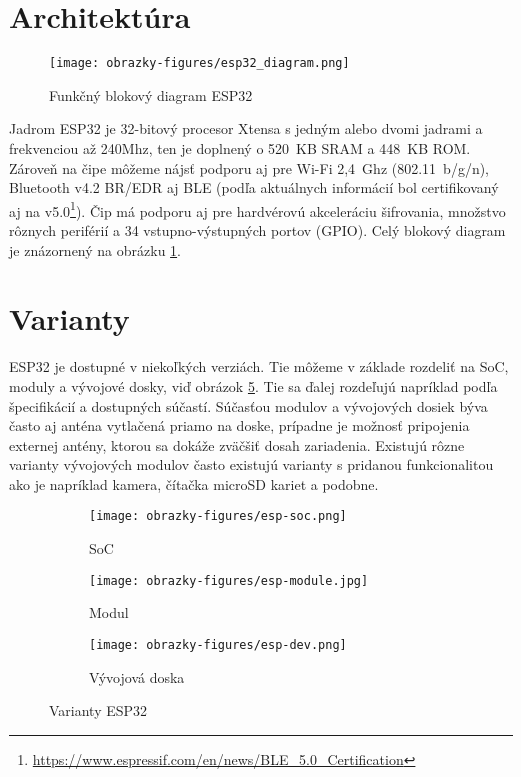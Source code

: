 \section{Architektúra}

\begin{figure}[ht]
    \centering
    \texttt{[image: obrazky-figures/esp32\_diagram.png]}
    \caption{Funkčný blokový diagram ESP32\cite{esp-datasheet}}
    \label{fig:esp_diagram}
\end{figure}

Jadrom ESP32 je 32-bitový procesor Xtensa s jedným alebo dvomi jadrami a frekvenciou až 240Mhz, ten je doplnený o 520~KB SRAM a 448~KB ROM. Zároveň na čipe môžeme nájsť podporu aj pre Wi-Fi 2,4~Ghz (802.11~b/g/n), Bluetooth v4.2 BR/EDR aj BLE (podľa aktuálnych informácií bol certifikovaný aj na v5.0\footnote{\url{https://www.espressif.com/en/news/BLE_5.0_Certification}}).
Čip má podporu aj pre hardvérovú akceleráciu šifrovania, množstvo rôznych periférií a 34 vstupno-výstupných portov (GPIO). Celý blokový diagram je znázornený na obrázku \ref{fig:esp_diagram}.\cite{esp-datasheet}


\section{Varianty}

ESP32 je dostupné v niekoľkých verziách. Tie môžeme v základe rozdeliť na SoC, moduly a vývojové dosky, viď obrázok \ref{fig:esp32_varianty}. Tie sa ďalej rozdeľujú napríklad podľa špecifikácií a dostupných súčastí. Súčasťou  modulov a vývojových dosiek býva často aj anténa vytlačená priamo na doske, prípadne je možnosť pripojenia externej antény, ktorou sa dokáže zväčšiť dosah zariadenia. Existujú rôzne varianty vývojových modulov často existujú varianty s pridanou funkcionalitou ako je napríklad kamera, čítačka microSD kariet a podobne.

\begin{figure}[ht]
    \centering
    \begin{subfigure}{.3\textwidth}
      \centering
      \texttt{[image: obrazky-figures/esp-soc.png]}  
      \caption{SoC\footnotemark[2]}
      \label{fig:esp32_soc}
    \end{subfigure}
    \begin{subfigure}{.3\textwidth}
      \centering
      \texttt{[image: obrazky-figures/esp-module.jpg]}  
      \caption{Modul\footnotemark[3]}
      \label{fig:esp32_module}
    \end{subfigure}
    \begin{subfigure}{.3\textwidth}
      \centering
      \texttt{[image: obrazky-figures/esp-dev.png]}
      \caption{Vývojová doska}
      \label{fig:esp32_dev}
    \end{subfigure}
    \caption{Varianty ESP32}
    \label{fig:esp32_varianty}
\end{figure}

